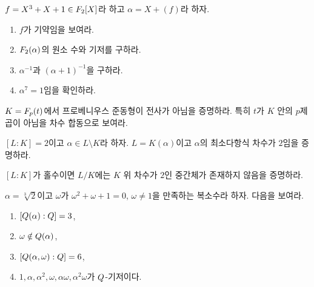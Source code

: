 \begin{exercise}[*]
$f=X^3+X+1\in F_2[X]$라 하고 $\alpha=X+(f)$라 하자.
\begin{enumerate}[label=(\alph*)]
  \item $f$가 기약임을 보여라.
  \item $F_2(\alpha)$의 원소 수와 기저를 구하라.
  \item $\alpha^{-1}$과 $(\alpha+1)^{-1}$을 구하라.
  \item $\alpha^7=1$임을 확인하라.
\end{enumerate}
\end{exercise}

\begin{exercise}[*]
$K=F_p(t)$에서 프로베니우스 준동형이 전사가 아님을 증명하라. 특히 $t$가 $K$ 안의 $p$제곱이 아님을 차수 합동으로 보여라.
\end{exercise}

\begin{exercise}
$[L:K]=2$이고 $\alpha\in L\setminus K$라 하자. $L=K(\alpha)$이고 $\alpha$의 최소다항식 차수가 $2$임을 증명하라.
\end{exercise}

\begin{exercise}
$[L:K]$가 홀수이면 $L/K$에는 $K$ 위 차수가 $2$인 중간체가 존재하지 않음을 증명하라.
\end{exercise}

\begin{exercise}[*]
$\alpha=\sqrt[3]{2}$이고 $\omega$가 $\omega^2+\omega+1=0$, $\omega\ne1$을 만족하는 복소수라 하자. 다음을 보여라.
\begin{enumerate}[label=(\alph*)]
  \item $[Q(\alpha):Q]=3$,
  \item $\omega\notin Q(\alpha)$,
  \item $[Q(\alpha,\omega):Q]=6$,
  \item $1,\alpha,\alpha^2,\omega,\alpha\omega,\alpha^2\omega$가 $Q$-기저이다.
\end{enumerate}
\end{exercise}
